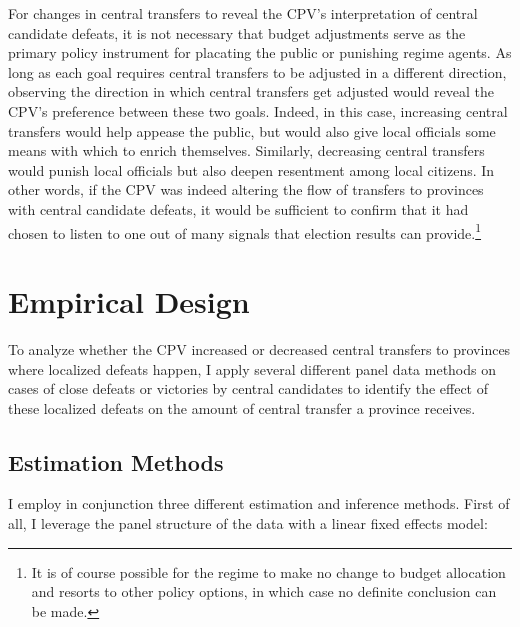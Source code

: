 \documentclass[12pt]{article}
\newcommand{\1}{\mathbbm{1}}
\begin{document}
For changes in central transfers to reveal the CPV's interpretation of central candidate defeats, it is not necessary that budget adjustments serve as the primary policy instrument for placating the public or punishing regime agents. As long as each goal requires central transfers to be adjusted in a different direction, observing the direction in which central transfers get adjusted would reveal the CPV's preference between these two goals. Indeed, in this case, increasing central transfers would help appease the public, but would also give local officials some means with which to enrich themselves. Similarly, decreasing central transfers would punish local officials but also deepen resentment among local citizens. In other words, if the CPV was indeed altering the flow of transfers to provinces with central candidate defeats, it would be sufficient to confirm that it had chosen to listen to one out of many signals that election results can provide.\footnote{It is of course possible for the regime to make no change to budget allocation and resorts to other policy options, in which case no definite conclusion can be made.}

\section{Empirical Design}
\label{sec:methods}

To analyze whether the CPV increased or decreased central transfers to provinces where localized defeats happen, I apply several different panel data methods on cases of close defeats or victories by central candidates to identify the effect of these localized defeats on the amount of central transfer a province receives.

\subsection{Estimation Methods}
\label{sec:methods_estimation}
I employ in conjunction three different estimation and inference methods. First of all, I leverage the panel structure of the data with a linear fixed effects model:
\end{document}
